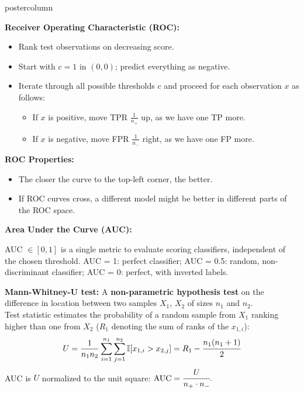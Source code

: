 \documentclass{beamer}
\begin{document}
\begin{frame}[fragile]{}
\begin{columns}
\begin{column}{.31\textwidth}
\begin{beamercolorbox}[center]{postercolumn}
\begin{minipage}{.98\textwidth}
{\begin{myblock}{}
    \begin{codebox}
    \textbf{Receiver Operating Characteristic (ROC): }
    \end{codebox}
      \begin{itemize}[$\bullet$]
        \setlength{\itemindent}{+.3in}
        \item Rank test observations on decreasing score.
        \item Start with $c = 1$ in $(0, 0)$; predict everything as negative.
        \item Iterate through all possible thresholds $c$ and proceed for each observation $x$ as follows:
        \begin{itemize}
          \item If $x$ is positive, move TPR $\frac{1}{n_+}$ up, as we have one TP more.
          \item If $x$ is negative, move FPR $\frac{1}{n_-}$ right, as we have one FP more.
        \end{itemize}
        \end{itemize}

          \textbf{ROC Properties: }
          \begin{itemize}[$\bullet$]
            \setlength{\itemindent}{+.3in}
            \item The closer the curve to the top-left corner, the better.
            \item If ROC curves cross, a different model might be better in different parts of the ROC space. 
            \end{itemize}

            \begin{codebox}
              \textbf{Area Under the Curve (AUC): }
            \end{codebox}
            AUC $\in [0,1]$ is a single metric to evaluate scoring classifiers, independent of the chosen threshold.
            AUC = 1: perfect classifier; AUC = 0.5: random, non-discriminant classifier; AUC = 0: perfect, with inverted labels.

            \textbf{Mann-Whitney-U test:} A \textbf{non-parametric hypothesis test} on the difference in location between two samples $X_1$, $X_2$ of sizes $n_1$ and $n_2$.\\
            Test statistic estimates the probability of a random sample from $X_1$ ranking higher than one from $X_2$ ($R_1$ denoting the sum of ranks of the $x_{1,i}$):
  $$ U = \frac{1}{n_1 n_2} \sum_{i = 1}^{n_1} \sum_{j = 1}^{n_2} \mathbb{I}[x_{1,i} > x_{2,j}] = R_1 - \cfrac{n_1(n_1 + 1)}{2}$$
            AUC is $U$ normalized to the unit square: $\text{AUC} = \cfrac{U}{n_{+} \cdot n_{-}}.$


\end{myblock}}
\end{minipage}
\end{beamercolorbox}
\end{column}
\end{columns}
\end{frame}
\end{document}
